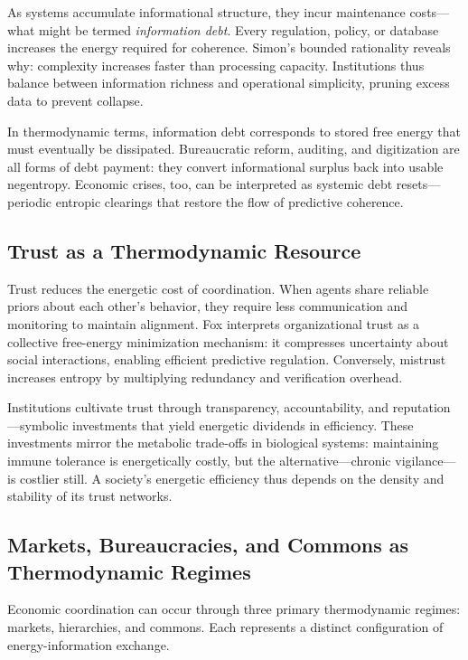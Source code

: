 \documentclass[11pt,a4paper]{article}
\begin{document}
As systems accumulate informational structure, they incur maintenance costs—what might be termed \emph{information debt}.  Every regulation, policy, or database increases the energy required for coherence.  Simon’s bounded rationality \citep{MarchSimon1958Organizations} reveals why: complexity increases faster than processing capacity.  Institutions thus balance between information richness and operational simplicity, pruning excess data to prevent collapse.

In thermodynamic terms, information debt corresponds to stored free energy that must eventually be dissipated.  Bureaucratic reform, auditing, and digitization are all forms of debt payment: they convert informational surplus back into usable negentropy.  Economic crises, too, can be interpreted as systemic debt resets—periodic entropic clearings that restore the flow of predictive coherence.

\subsection{Trust as a Thermodynamic Resource}

Trust reduces the energetic cost of coordination.  When agents share reliable priors about each other’s behavior, they require less communication and monitoring to maintain alignment.  Fox \citep{Fox2021AccessingActiveInference} interprets organizational trust as a collective free-energy minimization mechanism: it compresses uncertainty about social interactions, enabling efficient predictive regulation.  Conversely, mistrust increases entropy by multiplying redundancy and verification overhead.

Institutions cultivate trust through transparency, accountability, and reputation—symbolic investments that yield energetic dividends in efficiency.  These investments mirror the metabolic trade-offs in biological systems: maintaining immune tolerance is energetically costly, but the alternative—chronic vigilance—is costlier still.  A society’s energetic efficiency thus depends on the density and stability of its trust networks.

\subsection{Markets, Bureaucracies, and Commons as Thermodynamic Regimes}

Economic coordination can occur through three primary thermodynamic regimes: markets, hierarchies, and commons.  Each represents a distinct configuration of energy-information exchange.
\end{document}
